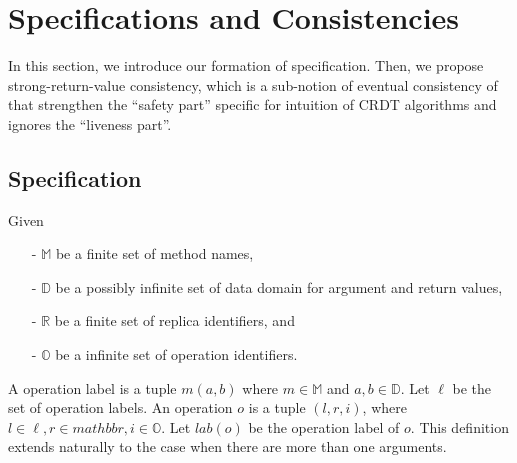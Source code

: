 
\section{Specifications and Consistencies}
\label{sec:specifications and consistencies}

In this section, we introduce our formation of specification. Then, we propose strong-return-value consistency, which is a sub-notion of eventual consistency of \cite{Bouajjani:2014} that strengthen the ``safety part'' specific for intuition of CRDT algorithms and ignores the ``liveness part''.


\subsection{Specification}
\label{subsec:specification}

Given

\begin{itemize}
\setlength{\itemsep}{0.5pt}
\item[-] $\mathbb{M}$ be a finite set of method names,

\item[-] $\mathbb{D}$ be a possibly infinite set of data domain for argument and return values,

\item[-] $\mathbb{R}$ be a finite set of replica identifiers, and

\item[-] $\mathbb{O}$ be a infinite set of operation identifiers.
\end{itemize}


A operation label is a tuple $m(a,b)$ where $m \in \mathbb{M}$ and $a,b \in \mathbb{D}$. Let $\ell$ be the set of operation labels. An operation $o$ is a tuple $(l,r,i)$, where $l \in \ell, r \in mathbb{r},i \in \mathbb{O}$. Let $lab(o)$ be the operation label of $o$. This definition extends naturally to the case when there are more than one arguments. 


